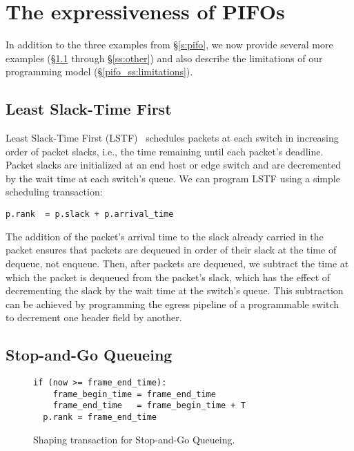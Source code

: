 \section{The expressiveness of PIFOs}
\label{s:expressive}

In addition to the three examples from \S\ref{s:pifo}, we now provide
several more examples (\S\ref{ss:lstf} through \S\ref{ss:other}) and
also describe the limitations of our programming model
(\S\ref{pifo_ss:limitations}).

%

\subsection{Least Slack-Time First}
\label{ss:lstf}

Least Slack-Time First (LSTF)~\cite{lstf,ups} schedules packets at
  each switch in increasing order of packet slacks, i.e., the time
  remaining until each packet's deadline.  Packet slacks are
  initialized at an end host or edge switch and are decremented by the
  wait time at each switch's queue. We can program LSTF using a simple 
  scheduling transaction:
\begin{lstlisting}[style=customc]
  p.rank  = p.slack + p.arrival_time
\end{lstlisting}

The addition of the packet's arrival time to the slack already carried
in the packet ensures that packets are dequeued in order of their
slack at the time of dequeue, not enqueue. Then, after packets are
dequeued, we subtract the time at which the packet is dequeued from
the packet's slack, which has the effect of decrementing the slack by
the wait time at the switch's queue. This subtraction can be achieved
by programming the egress pipeline of a programmable switch~\cite{rmt}
to decrement one header field by another.

\subsection{Stop-and-Go Queueing}
\label{ss:stopngo}

\begin{figure}[h]
  \begin{lstlisting}[style=customc]
  if (now >= frame_end_time):
    frame_begin_time = frame_end_time
    frame_end_time   = frame_begin_time + T
  p.rank = frame_end_time
  \end{lstlisting}
\caption{Shaping transaction for Stop-and-Go Queueing.}
\label{fig:stopngo}
\end{figure}

